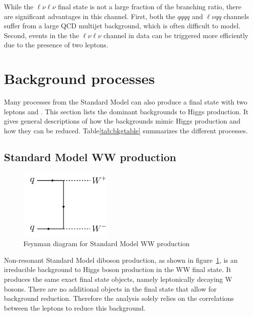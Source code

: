 While the $\ell\nu\ell\nu$ final state is not a large fraction of the branching ratio, there are significant advantages in this channel. First, both the $qqqq$ and $\ell\nu qq$ channels suffer from a large QCD multijet background, which is often difficult to model. Second, events in the the $\ell\nu\ell\nu$ channel in data can be triggered more efficiently due to the presence of two leptons. 

\section{Background processes}

Many processes from the Standard Model can also produce a final state with two leptons and \met. This section lists the dominant backgrounds to Higgs production. It gives general descriptions of how the backgrounds mimic Higgs production and how they can be reduced. Table\ref{tab:bkgtable} summarizes the different processes. 

\subsection{Standard Model WW production}

\begin{figure}[h!]
  \centering
  \captionsetup{justification=centering}

  \includegraphics[width=0.4\textwidth]{figures/Feyn_SMWW}
  \caption{Feynman diagram for Standard Model WW production}
  \label{fig:SMWWdiagram}
\end{figure}

Non-resonant Standard Model diboson production, as shown in figure~\ref{fig:SMWWdiagram}, is an irreducible background to Higgs boson production in the WW final state. It produces the same exact final state objects, namely leptonically decaying W bosons. There are no additional objects in the final state that allow for background reduction. Therefore the analysis solely relies on the correlations between the leptons to reduce this background. 

